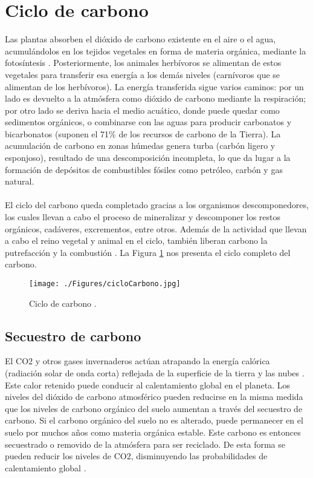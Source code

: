 \section{Ciclo de carbono} 
Las plantas absorben el di\'oxido de carbono existente en el aire o el agua, acumul\'andolos en los tejidos vegetales en forma de materia org\'anica, mediante la fotos\'intesis \cite{natur2015PW}. Posteriormente, los animales herb\'ivoros se alimentan de estos vegetales para transferir esa energ\'ia a los dem\'as niveles (carn\'ivoros que se alimentan de los herb\'ivoros).
La energ\'ia transferida sigue varios caminos: por un lado es devuelto a la atm\'osfera como di\'oxido de carbono mediante la respiraci\'on; por otro lado se deriva hacia el medio acu\'atico, donde puede quedar como sedimentos org\'anicos, o combinarse con las aguas para producir carbonatos y bicarbonatos (suponen el 71\% de los recursos de carbono de la Tierra). La acumulaci\'on de carbono en zonas h\'umedas genera turba (carb\'on ligero y esponjoso), resultado de una descomposici\'on incompleta, lo que da lugar a la formaci\'on de dep\'ositos de combustibles f\'osiles como petr\'oleo, carb\'on y gas natural.\\~\\
El ciclo del carbono queda completado gracias a los organismos des\-componedores, los cuales llevan a cabo el proceso de mineralizar y descomponer los restos org\'anicos, cad\'averes, excrementos, entre otros. Adem\'as de la actividad que llevan a cabo el reino vegetal y animal en el ciclo, tambi\'en liberan carbono la putrefacci\'on y la combusti\'on \cite{natur2015PW}. La Figura \ref{fig:ciclocarbono} nos presenta el ciclo completo del carbono.
    \begin{figure}[!hbtp]
    	\centering
    	\texttt{[image: ./Figures/cicloCarbono.jpg]}
    	\caption{Ciclo de carbono \cite{ciclot2015carbo}.}
    	\label{fig:ciclocarbono}
    \end{figure}


\subsection{Secuestro de carbono}
El CO2 y otros gases invernaderos act\'uan atrapando la energ\'ia cal\'orica (radiaci\'on solar de onda corta) reflejada de la superficie de la tierra y las nubes \cite{encaptura}. Este calor retenido puede conducir al calentamiento global en el planeta. Los niveles del di\'oxido de carbono atmosf\'erico pueden reducirse en la misma medida que los niveles de carbono org\'anico del suelo aumentan a trav\'es del secuestro de carbono. Si el carbono org\'anico del suelo no es alterado, puede permanecer en el suelo por muchos a\~{n}os como materia org\'anica estable. Este carbono es entonces secuestrado o removido de la atm\'osfera para ser reciclado. De esta forma se pueden reducir los niveles de CO2, disminuyendo las probabilidades de calentamiento global \cite{castillo2003manejo}.
